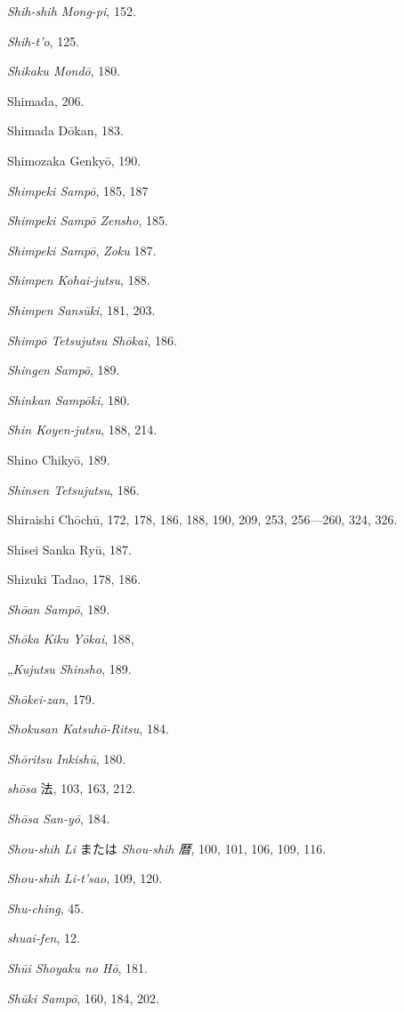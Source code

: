 \documentclass[11pt]{article}
\newcommand{\scanpage}[2]{\clearpage\setcounter{footnote}{0}\noindent{\footnotesize\color{gray}PDF #1 頁 · #2}\par\medskip}
\begin{document}
\scanpage{0357}{印刷頁 343}
\emph{Shih-shih Mong-pi}, 152.\par
\emph{Shih-t'o}, 125.\par
\emph{Shikaku Mondō}, 180.\par
Shimada, 206.\par
Shimada Dōkan, 183.\par
Shimozaka Genkyō, 190.\par
\emph{Shimpeki Sampō}, 185, 187\par
\emph{Shimpeki Sampō Zensho}, 185.\par
\emph{Shimpeki Sampō}, \emph{Zoku} 187.\par
\emph{Shimpen Kohai-jutsu}, 188.\par
\emph{Shimpen Sansūki}, 181, 203.\par
\emph{Shimpō Tetsujutsu Shōkai}, 186.\par
\emph{Shingen Sampō}, 189.\par
\emph{Shinkan Sampōki}, 180.\par
\emph{Shin Koyen-jutsu}, 188, 214.\par
Shino Chikyō, 189.\par
\emph{Shinsen Tetsujutsu}, 186.\par
Shiraishi Chōchū, 172, 178, 186, 188, 190, 209, 253, 256---260, 324, 326.\par
Shisei Sanka Ryū, 187.\par
Shizuki Tadao, 178, 186.\par
\emph{Shōan Sampō}, 189.\par
\emph{Shōka Kiku Yōkai}, 188,\par
\quad „\quad \emph{Kujutsu Shinsho}, 189.\par
\emph{Shōkei-zan}, 179.\par
\emph{Shokusan Katsuhō-Ritsu}, 184.\par
\emph{Shōritsu Inkishū}, 180.\par
\emph{shōsa} 法, 103, 163, 212.\par
\emph{Shōsa San-yō}, 184.\par
\emph{Shou-shih Li} または \emph{Shou-shih 暦}, 100, 101, 106, 109, 116.\par
\emph{Shou-shih Li-t'sao}, 109, 120.\par
\emph{Shu-ching}, 45.\par
\emph{shuai-fen}, 12.\par
\emph{Shūi Shoyaku no Hō}, 181.\par
\emph{Shūki Sampō}, 160, 184, 202.\par
\end{document}

